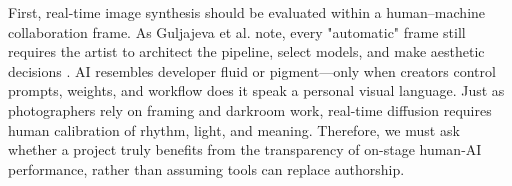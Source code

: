 \documentclass[sigconf,nonacm]{acmart}
\begin{document}
First, real-time image synthesis should be evaluated within a human–machine collaboration frame. As Guljajeva et al. note, every "automatic" frame still requires the artist to architect the pipeline, select models, and make aesthetic decisions \cite{guljajeva_canet_sola_artist_2024}. AI resembles developer fluid or pigment—only when creators control prompts, weights, and workflow does it speak a personal visual language. Just as photographers rely on framing and darkroom work, real-time diffusion requires human calibration of rhythm, light, and meaning. Therefore, we must ask whether a project truly benefits from the transparency of on-stage human-AI performance, rather than assuming tools can replace authorship.
\end{document}
